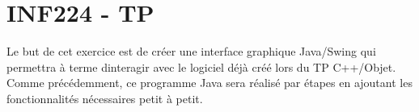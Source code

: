 \chapter{INF224 -\/ TP}
\hypertarget{md_swing_2_r_e_a_d_m_e}{}\label{md_swing_2_r_e_a_d_m_e}
\label{md_swing_2_r_e_a_d_m_e_autotoc_md1}%
%
Le but de cet exercice est de créer une interface graphique Java/\+Swing qui permettra à terme d\textquotesingle{}interagir avec le logiciel déjà créé lors du TP C++/\+Objet. Comme précédemment, ce programme Java sera réalisé par étapes en ajoutant les fonctionnalités nécessaires petit à petit. 